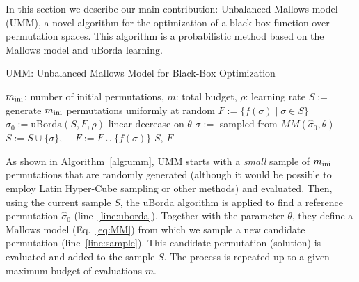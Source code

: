 \documentclass[runningheads]{llncs}
\newcommand{\assign}{\ensuremath{:=}}
\begin{document}
In this section we describe our main contribution: Unbalanced Mallows model
(UMM), a novel algorithm for the optimization of a black-box function over
permutation spaces. This algorithm is a probabilistic method based on the
Mallows model and uBorda learning.


\begin{algorithm}[t]
 \caption{UMM: Unbalanced Mallows Model for Black-Box Optimization}
 \label{alg:umm}
  \begin{algorithmic}[1]
    \Require $m_\text{ini}$: number of initial permutations, $m$: total budget, $\rho$: learning rate
    \State $S \assign $ generate $m_\text{ini}$ permutations uniformly at random
    \State $F \assign \{ f(\sigma) \mid \sigma \in S\}$ 
    \For{$i \assign \minit$ \textbf{to} $m$ \text{evaluations}}
    \State $\hat\sigma_0 \assign \text{uBorda}(S, F,\rho)$\label{line:uborda}
    \State linear decrease on $\theta$
    \State $\sigma \assign$ sampled from  $MM(\hat\sigma_0, \theta)$\label{line:sample}
    \State $S \assign S \cup \{\sigma\}$, $\quad F \assign F \cup \{f(\sigma)\}$
    \EndFor 
    \State \Return $S$, $F$
 \end{algorithmic}
\end{algorithm}


As shown in Algorithm~\ref{alg:umm}, UMM  starts with a \emph{small} sample of $m_\text{ini}$ permutations that are randomly generated (although it would be possible to employ Latin Hyper-Cube sampling or other methods) and evaluated. Then, using the current sample $S$, the uBorda algorithm is applied to find a reference permutation $\hat{\sigma}_0$ (line~\ref{line:uborda}). Together with the parameter $\theta$, they define a Mallows model (Eq.~\ref{eq:MM}) from which we sample a new candidate permutation (line~\ref{line:sample}). This candidate permutation (solution) is evaluated and added to the sample $S$. The process is repeated up to a given maximum budget of evaluations $m$.
\end{document}
